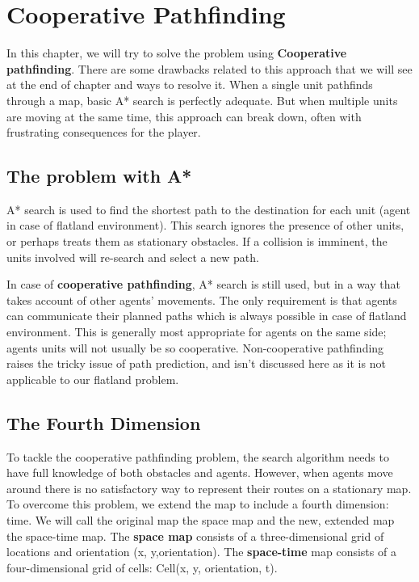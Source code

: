 \chapter{Cooperative Pathfinding}

In this chapter, we will try to solve the problem using \textbf{Cooperative pathfinding}\cite{ARTICLE:8}.
There are some drawbacks related to this approach that we will see at the end of chapter and 
ways to resolve it.
When a single unit pathfinds through a map, basic A* search is perfectly adequate. But
when multiple units are moving at the same time, this approach can break down, often
with frustrating consequences for the player.

\section{The problem with A*}
A* search is used to find
the shortest path to the destination for each unit (agent in case of flatland environment). This search ignores the
presence of other units, or perhaps treats them as stationary obstacles. If a collision is
imminent, the units involved will re-search and select a new path.

\vspace {\baselineskip}
In case of \textbf{cooperative pathfinding}, A* search is still used, but in a way that takes account of other
agents’ movements. The only requirement is that agents can communicate their planned paths which is always
possible in case of flatland environment. This is generally
most appropriate for agents on the same side; agents 
units will not usually be so cooperative. 
Non-cooperative pathfinding raises the tricky issue of path prediction, and
isn’t discussed here as it is not applicable to our flatland problem.

\section{The Fourth Dimension}
To tackle the cooperative pathfinding problem, the search algorithm needs to have full
knowledge of both obstacles and agents. However, when agents move around there is no
satisfactory way to represent their routes on a stationary map. To overcome this problem,
we extend the map to include a fourth dimension: time. We will call the original map the
space map and the new, extended map the space-time map.
The \textbf{space map} consists of a three-dimensional grid of
locations and orientation (x, y,orientation). The \textbf{space-time} map consists of a four-dimensional grid
of cells: Cell(x, y, orientation, t).

